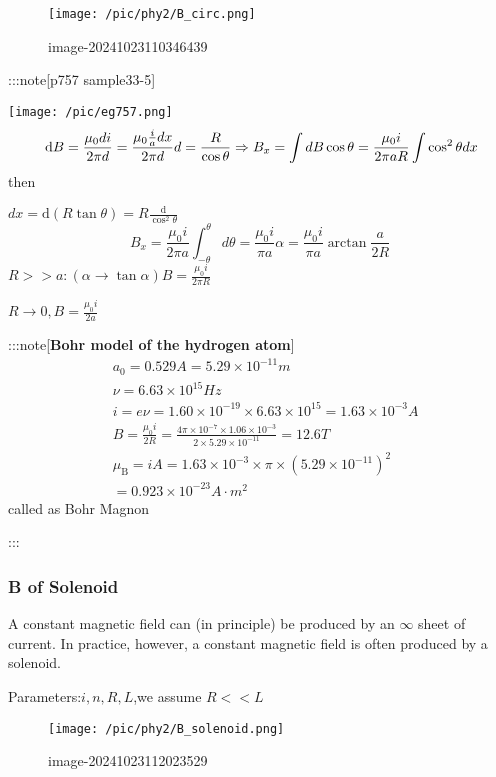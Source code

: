 \documentclass[
]{article}
\begin{document}
\begin{figure}
\centering
\texttt{[image: /pic/phy2/B\_circ.png]}
\caption{image-20241023110346439}
\end{figure}

:::note{[}p757 sample33-5{]}

\texttt{[image: /pic/eg757.png]} \[ {\frac{}{}}
\mathrm d B=\frac{\mu _0 di}{2\pi d}=\frac{\mu _0 \frac{i}{a} dx}{2\pi d}\\
d=\frac{R}{\cos \theta }\Rightarrow B_x=\int dB\cos \theta=\frac{\mu_0i}{2\pi a R}\int \cos^2\theta dx
\] then

\(dx=\mathrm d (R\tan \theta)=R\frac{\mathrm d}{\cos^2\theta }\) \[
B_x=\frac{\mu_0 i}{2\pi a}\int_{-\theta}^{\theta}d\theta =\frac{\mu _0 i}{\pi a}\alpha =\frac{\mu_0 i}{\pi a}\arctan \frac{a}{2R}
\] \(R>>a:(\alpha \to \tan \alpha)B=\frac{\mu_0 i}{2\pi R}\)

\(R\to 0,B=\frac{\mu_0i}{2a}\)\hspace{0pt}

:::note{[}\textbf{Bohr model of the hydrogen atom}{]} \[
\begin{aligned}&a_0=0.529A=5.29\times10^{-11}m\\&\nu=6.63\times10^{15}Hz\\&i=e\nu=1.60\times10^{-19}\times6.63\times10^{15}=1.63\times10^{-3}A\\&B=\frac{\mu_0i}{2R}=\frac{4\pi\times10^{-7}\times1.06\times10^{-3}}{2\times5.29\times10^{-11}}=12.6T\\&\mu_\mathrm{B}=iA=1.63\times10^{-3}\times\pi\times(5.29\times10^{-11})^2\\&=0.923\times10^{-23}A\cdot m^2\end{aligned}
\] called as Bohr Magnon

:::

\hypertarget{b-of-solenoid}{%
\subsubsection{B of Solenoid}\label{b-of-solenoid}}

A constant magnetic field can (in principle) be produced by an
\(\infty\)\hspace{0pt} sheet of current. In practice, however, a
constant magnetic field is often produced by a solenoid.

Parameters:\(i,n,R,L\),we assume \(R<<L\)

\begin{figure}
\centering
\texttt{[image: /pic/phy2/B\_solenoid.png]}
\caption{image-20241023112023529}
\end{figure}
\end{document}
